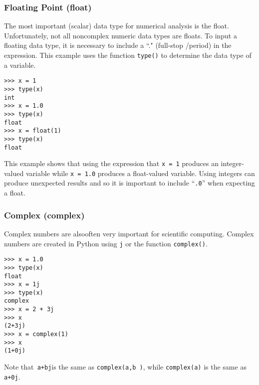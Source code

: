 \documentclass[Pydata.tex]{subfiles}
\begin{document}
\subsubsection{Floating Point (float)}
The most important (scalar) data type for numerical analysis is the float. Unfortunately, not all noncomplex
numeric data types are floats. To input a floating data type, it is necessary to include a ``." (full-stop /period) in the expression. This example uses the function \texttt{type()} to determine the data type of a variable.
\begin{framed}
\begin{verbatim}
>>> x = 1
>>> type(x)
int
>>> x = 1.0
>>> type(x)
float
>>> x = float(1)
>>> type(x)
float
\end{verbatim}
\end{framed}
This example shows that using the expression that \texttt{x = 1} produces an integer-valued variable while \texttt{x = 1.0}
produces a float-valued variable. Using integers can produce unexpected results and so it is important to
include ``\texttt{.0}” when expecting a float.
\newpage
\subsubsection{Complex (complex)}

Complex numbers are alsooften very important for scientific computing. Complex numbers are created in Python
using \texttt{j} or the function \texttt{complex()}.
\begin{framed}
\begin{verbatim}
>>> x = 1.0
>>> type(x)
float
>>> x = 1j
>>> type(x)
complex
>>> x = 2 + 3j
>>> x
(2+3j)
>>> x = complex(1)
>>> x
(1+0j)
\end{verbatim}
\end{framed}
\noindent Note that\texttt{ a+bj}is the same as \texttt{complex(a,b )}, while \texttt{complex(a)} is the same as \texttt{a+0j}.


\end{document}
